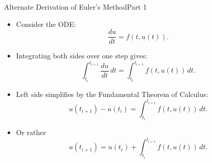 \documentclass[10pt]{beamer}
\begin{document}


\begin{frame}{Alternate Derivation of Euler's Method}{Part 1}
\begin{itemize}
    \item Consider the ODE:
    \[
    \frac{du}{dt} = f(t, u(t)).
    \]
    
    \item Integrating both sides over one step gives:
    \[
    \int_{t_i}^{t_{i+1}} \frac{du}{dt} \, dt = \int_{t_i}^{t_{i+1}} f(t, u(t)) \, dt.
    \]

    \item Left side simplifies by the Fundamental Theorem of Calculus:
    \[
    u(t_{i+1}) - u(t_i) = \int_{t_i}^{t_{i+1}} f(t, u(t)) \, dt.
    \]
    \item Or rather
    \[
    u(t_{i+1}) = u(t_i) + \int_{t_i}^{t_{i+1}} f(t, u(t)) \, dt.
    \]

\end{itemize}
\end{frame}

\end{document}
